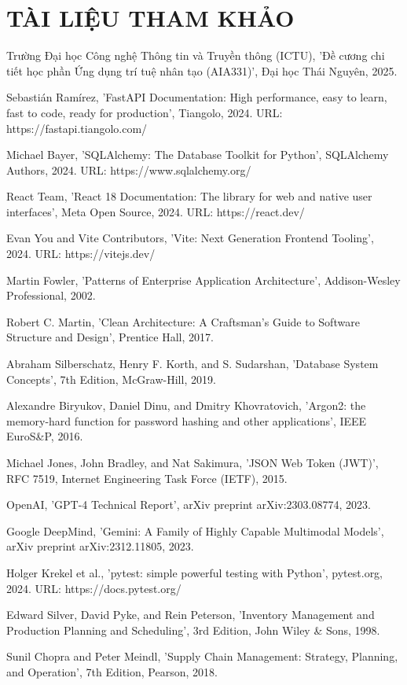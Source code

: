 \chapter*{TÀI LIỆU THAM KHẢO}

\begin{enumerate}[label={[\arabic*]}]
  \item Trường Đại học Công nghệ Thông tin và Truyền thông (ICTU), 'Đề cương chi tiết học phần Ứng dụng trí tuệ nhân tạo (AIA331)', Đại học Thái Nguyên, 2025.
  \item Sebastián Ramírez, 'FastAPI Documentation: High performance, easy to learn, fast to code, ready for production', Tiangolo, 2024. URL: https://fastapi.tiangolo.com/
  \item Michael Bayer, 'SQLAlchemy: The Database Toolkit for Python', SQLAlchemy Authors, 2024. URL: https://www.sqlalchemy.org/
  \item React Team, 'React 18 Documentation: The library for web and native user interfaces', Meta Open Source, 2024. URL: https://react.dev/
  \item Evan You and Vite Contributors, 'Vite: Next Generation Frontend Tooling', 2024. URL: https://vitejs.dev/
  \item Martin Fowler, 'Patterns of Enterprise Application Architecture', Addison-Wesley Professional, 2002.
  \item Robert C. Martin, 'Clean Architecture: A Craftsman's Guide to Software Structure and Design', Prentice Hall, 2017.
  \item Abraham Silberschatz, Henry F. Korth, and S. Sudarshan, 'Database System Concepts', 7th Edition, McGraw-Hill, 2019.
  \item Alexandre Biryukov, Daniel Dinu, and Dmitry Khovratovich, 'Argon2: the memory-hard function for password hashing and other applications', IEEE EuroS\&P, 2016.
  \item Michael Jones, John Bradley, and Nat Sakimura, 'JSON Web Token (JWT)', RFC 7519, Internet Engineering Task Force (IETF), 2015.
  \item OpenAI, 'GPT-4 Technical Report', arXiv preprint arXiv:2303.08774, 2023.
  \item Google DeepMind, 'Gemini: A Family of Highly Capable Multimodal Models', arXiv preprint arXiv:2312.11805, 2023.
  \item Holger Krekel et al., 'pytest: simple powerful testing with Python', pytest.org, 2024. URL: https://docs.pytest.org/
  \item Edward Silver, David Pyke, and Rein Peterson, 'Inventory Management and Production Planning and Scheduling', 3rd Edition, John Wiley \& Sons, 1998.
  \item Sunil Chopra and Peter Meindl, 'Supply Chain Management: Strategy, Planning, and Operation', 7th Edition, Pearson, 2018.
\end{enumerate}
